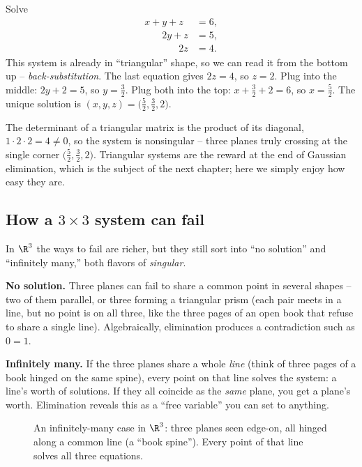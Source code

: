 \begin{example}
\label{ch06:ex-3x3}
Solve
\[
  \begin{aligned}
    x + y + z &= 6,\\
    \phantom{x +{}} 2y + z &= 5,\\
    \phantom{x + y +{}} 2z &= 4.
  \end{aligned}
\]
This system is already in ``triangular'' shape, so we can read it from the
bottom up -- \emph{back-substitution}. The last equation gives $2z=4$, so
$z=2$. Plug into the middle: $2y+2=5$, so $y=\tfrac32$. Plug both into the
top: $x+\tfrac32+2=6$, so $x=\tfrac52$. The unique solution is
$(x,y,z)=\bigl(\tfrac52,\tfrac32,2\bigr)$.

The determinant of a triangular matrix is the product of its diagonal,
$1\cdot2\cdot2=4\neq0$, so the system is nonsingular -- three planes truly
crossing at the single corner $\bigl(\tfrac52,\tfrac32,2\bigr)$. Triangular
systems are the reward at the end of Gaussian elimination, which is the
subject of the next chapter; here we simply enjoy how easy they are.
\end{example}

\subsection{How a $3\times3$ system can fail}

In $\R^3$ the ways to fail are richer, but they still sort into ``no
solution'' and ``infinitely many,'' both flavors of \emph{singular}.

\textbf{No solution.} Three planes can fail to share a common point in
several shapes -- two of them parallel, or three forming a triangular prism
(each pair meets in a line, but no point is on all three, like the three
pages of an open book that refuse to share a single line). Algebraically,
elimination produces a contradiction such as $0=1$.

\textbf{Infinitely many.} If the three planes share a whole \emph{line}
(think of three pages of a book hinged on the same spine), every point on
that line solves the system: a line's worth of solutions. If they all
coincide as the \emph{same} plane, you get a plane's worth. Elimination
reveals this as a ``free variable'' you can set to anything.

\begin{figure}[H]
\centering
{}
\caption{An infinitely-many case in $\R^3$: three planes seen edge-on, all
hinged along a common line (a ``book spine''). Every point of that line
solves all three equations.}
\label{ch06:spine}
\end{figure}

